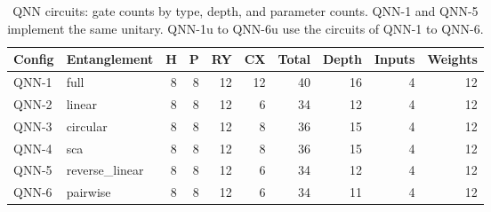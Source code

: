 \begin{table}[htbp]
\centering
\small
\caption{QNN circuits: gate counts by type, depth, and parameter counts. QNN-1 and QNN-5 implement the same unitary. QNN-1u to QNN-6u use the circuits of QNN-1 to QNN-6.}
\label{tab:t2}
\begin{tabular}{llrrrrrrrr}
\toprule
Config & Entanglement & H & P & RY & CX & Total & Depth & Inputs & Weights \\
\midrule
QNN-1 & full & 8 & 8 & 12 & 12 & 40 & 16 & 4 & 12 \\
QNN-2 & linear & 8 & 8 & 12 & 6 & 34 & 12 & 4 & 12 \\
QNN-3 & circular & 8 & 8 & 12 & 8 & 36 & 15 & 4 & 12 \\
QNN-4 & sca & 8 & 8 & 12 & 8 & 36 & 15 & 4 & 12 \\
QNN-5 & reverse\_linear & 8 & 8 & 12 & 6 & 34 & 12 & 4 & 12 \\
QNN-6 & pairwise & 8 & 8 & 12 & 6 & 34 & 11 & 4 & 12 \\
\bottomrule
\end{tabular}
\end{table}
